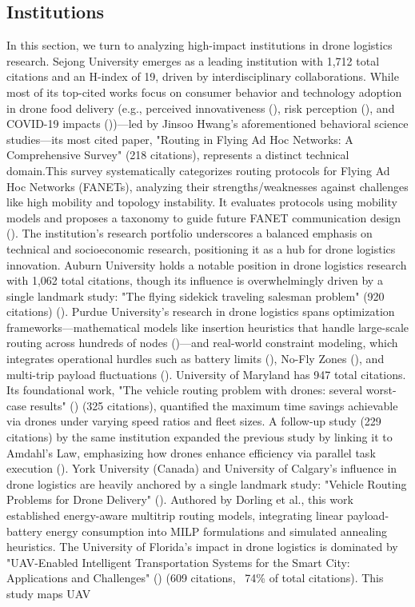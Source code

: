 \documentclass{article}
\begin{document}
\subsection{Institutions}
In this section, we turn to analyzing high-impact institutions in drone logistics research. Sejong University emerges as a leading institution with 1,712 total citations and an H-index of 19, driven by interdisciplinary collaborations. While most of its top-cited works focus on consumer behavior and technology adoption in drone food delivery (e.g., perceived innovativeness (\cite{WOS:000478712400012}), risk perception (\cite{WOS:000495004400013}), and COVID-19 impacts (\cite{WOS:000605628800016}))—led by Jinsoo Hwang’s aforementioned behavioral science studies—its most cited paper, "Routing in Flying Ad Hoc Networks: A Comprehensive Survey" (218 citations), represents a distinct technical domain.This survey systematically categorizes routing protocols for Flying Ad Hoc Networks (FANETs), analyzing their strengths/weaknesses against challenges like high mobility and topology instability. It evaluates protocols using mobility models and proposes a taxonomy to guide future FANET communication design (\cite{WOS:000538038400010}). The institution’s research portfolio underscores a balanced emphasis on technical and socioeconomic research, positioning it as a hub for drone logistics innovation. Auburn University holds a notable position in drone logistics research with 1,062 total citations, though its influence is overwhelmingly driven by a single landmark study: "The flying sidekick traveling salesman problem" (920 citations) (\cite{WOS:000353871700006}). Purdue University's research in drone logistics spans optimization frameworks—mathematical models like insertion heuristics that handle large-scale routing across hundreds of nodes (\cite{WOS:000460496000002})—and real-world constraint modeling, which integrates operational hurdles such as battery limits (\cite{WOS:000532795300023}), No-Fly Zones (\cite{WOS:000474324300017}), and multi-trip payload fluctuations (\cite{WOS:000523602300006}). University of Maryland has 947 total citations. Its foundational work, "The vehicle routing problem with drones: several worst-case results" (\cite{WOS:000400384200003})  (325 citations), quantified the maximum time savings achievable via drones under varying speed ratios and fleet sizes. A follow-up study  (229 citations) by the same institution expanded the previous study by linking it to Amdahl’s Law, emphasizing how drones enhance efficiency via parallel task execution (\cite{WOS:000404719400004}). York University (Canada) and University of Calgary's influence in drone logistics are heavily anchored by a single landmark study: "Vehicle Routing Problems for Drone Delivery" (\cite{WOS:000391480400007}). Authored by Dorling et al., this work established energy-aware multitrip routing models, integrating linear payload-battery energy consumption into MILP formulations and simulated annealing heuristics. The University of Florida's impact in drone logistics is dominated by "UAV-Enabled Intelligent Transportation Systems for the Smart City: Applications and Challenges" (\cite{WOS:000398037700003}) (609 citations, ~74\% of total citations). This study maps UAV 
\end{document}

